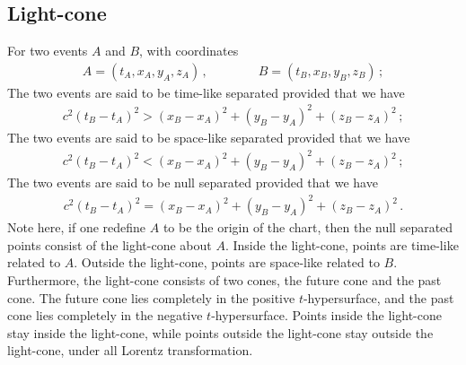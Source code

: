 \documentclass[11pt, onesided]{book}
\theoremstyle{break}
\theoremstyle{break}
\begin{document}
\subsection{Light-cone}
For two events $A$ and $B$, with coordinates
\begin{align*}
A = (t_A,x_A,y_A,z_A)\,,\qquad\qquad
B = (t_B,x_B,y_B,z_B)\,;
\end{align*}
The two events are said to be time-like separated provided that we have
\begin{align*}
c^2(t_B - t_A)^2 > (x_B - x_A)^2 + (y_B - y_A)^2 + (z_B - z_A)^2\,;
\end{align*}
The two events are said to be space-like separated provided that we have
\begin{align*}
c^2(t_B - t_A)^2 < (x_B - x_A)^2 + (y_B - y_A)^2 + (z_B - z_A)^2\,;
\end{align*}
The two events are said to be null separated provided that we have
\begin{align*}
c^2(t_B - t_A)^2 = (x_B - x_A)^2 + (y_B - y_A)^2 + (z_B - z_A)^2\,.
\end{align*}
Note here, if one redefine $A$ to be the origin of the chart, then the null separated points consist of the light-cone about $A$. Inside the light-cone, points are time-like related to $A$. Outside the light-cone, points are space-like related to $B$. Furthermore, the light-cone consists of two cones, the future cone and the past cone. The future cone lies completely in the positive $t$-hypersurface, and the past cone lies completely in the negative $t$-hypersurface. Points inside the light-cone stay inside the light-cone, while points outside the light-cone stay outside the light-cone, under all Lorentz transformation.\\
\end{document}
